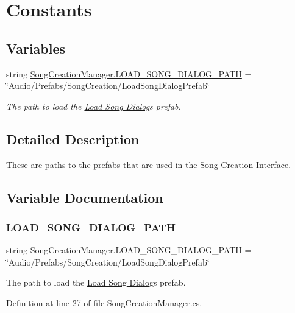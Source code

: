 \hypertarget{group___s_c_m_const}{}\section{Constants}
\label{group___s_c_m_const}
\subsection*{Variables}
\begin{DoxyCompactItemize}
\item 
string \hyperlink{group___s_c_m_const_ga821945ef78c5b9411d7861b42407591e}{Song\+Creation\+Manager.\+L\+O\+A\+D\+\_\+\+S\+O\+N\+G\+\_\+\+D\+I\+A\+L\+O\+G\+\_\+\+P\+A\+TH} = \char`\"{}Audio/Prefabs/Song\+Creation/Load\+Song\+Dialog\+Prefab\char`\"{}
\begin{DoxyCompactList}\small\item\em The path to load the \hyperlink{group___doc_s_c___l_s_d}{Load Song Dialog}\textquotesingle{}s prefab. \end{DoxyCompactList}\end{DoxyCompactItemize}


\subsection{Detailed Description}
These are paths to the prefabs that are used in the \hyperlink{group___doc_s_c}{Song Creation Interface}. 

\subsection{Variable Documentation}
\mbox{\label{group___s_c_m_const_ga821945ef78c5b9411d7861b42407591e}} 
\subsubsection{\texorpdfstring{L\+O\+A\+D\+\_\+\+S\+O\+N\+G\+\_\+\+D\+I\+A\+L\+O\+G\+\_\+\+P\+A\+TH}{LOAD\_SONG\_DIALOG\_PATH}}
{\footnotesize\ttfamily string Song\+Creation\+Manager.\+L\+O\+A\+D\+\_\+\+S\+O\+N\+G\+\_\+\+D\+I\+A\+L\+O\+G\+\_\+\+P\+A\+TH = \char`\"{}Audio/Prefabs/Song\+Creation/Load\+Song\+Dialog\+Prefab\char`\"{}\hspace{0.3cm}{\ttfamily [private]}}



The path to load the \hyperlink{group___doc_s_c___l_s_d}{Load Song Dialog}\textquotesingle{}s prefab. 



Definition at line 27 of file Song\+Creation\+Manager.\+cs.

